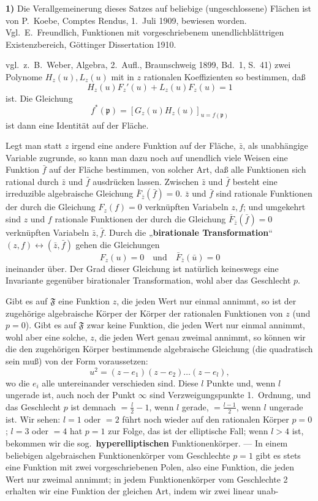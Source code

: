 \documentclass{article}
\begin{document}
\textbf{1)} Die Verallgemeinerung dieses Satzes auf beliebige (ungeschlossene) Flächen ist von P.~Koebe, Comptes Rendus, 1.~Juli 1909, bewiesen worden. Vgl.\ E.~Freundlich, Funktionen mit vorgeschriebenem unendlichblättrigen Existenzbereich, Göttinger Dissertation 1910.

vgl.\ z.~B.\ Weber, Algebra, 2.\ Aufl., Braunschweig 1899, Bd.~1, S.~41) zwei Polynome $H_z(u), L_z(u)$ mit in $z$ rationalen Koeffizienten so bestimmen, daß
\[ H_z(u) F_z'(u) + L_z(u) F_z(u) = 1 \]
ist. Die Gleichung
\[ f^*(\mathfrak{p}) = [G_z(u) H_z(u)]_{u = f(\mathfrak{p})} \]
ist dann eine Identität auf der Fläche.

Legt man statt $z$ irgend eine andere Funktion auf der Fläche, $\bar{z}$, als unabhängige Variable zugrunde, so kann man dazu noch auf unendlich viele Weisen eine Funktion $\bar{f}$ auf der Fläche bestimmen, von solcher Art, daß alle Funktionen sich rational durch $\bar{z}$ und $\bar{f}$ ausdrücken lassen. Zwischen $\bar{z}$ und $\bar{f}$ besteht eine irreduzible algebraische Gleichung $\bar{F}_{\bar{z}}(\bar{f}) = 0$. $\bar{z}$ und $\bar{f}$ sind rationale Funktionen der durch die Gleichung $F_z(f) = 0$ verknüpften Variabeln $z, f$; und umgekehrt sind $z$ und $f$ rationale Funktionen der durch die Gleichung $\bar{F}_{\bar{z}}(\bar{f}) = 0$ verknüpften Variabeln $\bar{z}, \bar{f}$. Durch die „\textbf{birationale Transformation}“ $(z, f) \longleftrightarrow (\bar{z}, \bar{f})$ gehen die Gleichungen
\[ F_z(u) = 0 \quad \text{und} \quad \bar{F}_{\bar{z}}(\bar{u}) = 0 \]
ineinander über. Der Grad dieser Gleichung ist natürlich keineswegs eine Invariante gegenüber birationaler Transformation, wohl aber das Geschlecht $p$.

Gibt es auf $\mathfrak{F}$ eine Funktion $z$, die jeden Wert nur einmal annimmt, so ist der zugehörige algebraische Körper der Körper der rationalen Funktionen von $z$ (und $p = 0$). Gibt es auf $\mathfrak{F}$ zwar keine Funktion, die jeden Wert nur einmal annimmt, wohl aber eine solche, $z$, die jeden Wert genau zweimal annimmt, so können wir die den zugehörigen Körper bestimmende algebraische Gleichung (die quadratisch sein muß) von der Form voraussetzen:
\[ u^2 = (z - e_1)(z - e_2) \dots (z - e_l), \]
wo die $e_i$ alle untereinander verschieden sind. Diese $l$ Punkte und, wenn $l$ ungerade ist, auch noch der Punkt $\infty$ sind Verzweigungspunkte 1.\ Ordnung, und das Geschlecht $p$ ist demnach $= \frac{l}{2} - 1$, wenn $l$ gerade, $= \frac{l - 1}{2}$, wenn $l$ ungerade ist. Wir sehen: $l = 1$ oder $= 2$ führt noch wieder auf den rationalen Körper $p = 0$; $l = 3$ oder $= 4$ hat $p = 1$ zur Folge, das ist der elliptische Fall; wenn $l > 4$ ist, bekommen wir die sog.\ \textbf{hyperelliptischen} Funktionenkörper. --- In einem beliebigen algebraischen Funktionenkörper vom Geschlechte $p = 1$ gibt es stets eine Funktion mit zwei vorgeschriebenen Polen, also eine Funktion, die jeden Wert nur zweimal annimmt; in jedem Funktionenkörper vom Geschlechte 2 erhalten wir eine Funktion der gleichen Art, indem wir zwei linear unab-
\end{document}
